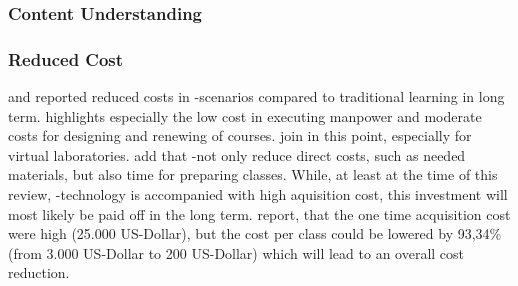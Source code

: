 \subsubsection{Content Understanding}

% 
\subsubsection{Reduced Cost}
\cite{Leblanc.2010} and \cite{MartinGutierrez.2011} reported reduced costs in \ARns-scenarios compared to traditional learning in long term. \cite{Chen.2012} highlights especially the low cost in executing manpower and moderate costs for designing and renewing of courses.\autocite[cf.][640]{Chen.2012} \cite{Andujar.2011} join in this point, especially for virtual laboratories.\autocite[cf.][492]{Andujar.2011} \cite{Andujar.2011} add that \ARns-\apps not only reduce direct costs, such as needed materials, but also time for preparing classes. While, at least at the time of this review, \ARns-technology is accompanied with high aquisition cost, this investment will most likely be paid off in the long term. \cite{Leblanc.2010} report, that the one time acquisition cost were high (25.000 US-Dollar)\autocite[253]{Leblanc.2010}, but the cost per class could be lowered by 93,34\% (from 3.000 US-Dollar to 200 US-Dollar)\autocite[253]{Leblanc.2010} which will lead to an overall cost reduction.